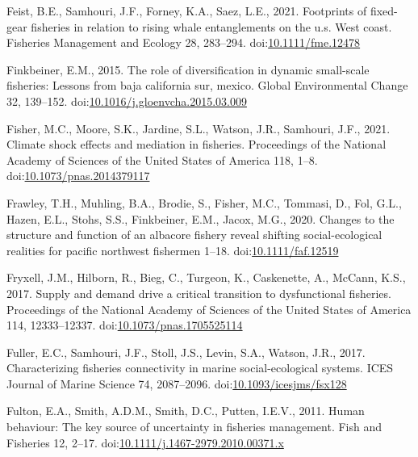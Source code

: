 \documentclass[]{elsarticle} %
\begin{document}
\leavevmode\hypertarget{ref-Feist2021}{}%
Feist, B.E., Samhouri, J.F., Forney, K.A., Saez, L.E., 2021. Footprints
of fixed-gear fisheries in relation to rising whale entanglements on the
u.s. West coast. Fisheries Management and Ecology 28, 283--294.
doi:\href{https://doi.org/10.1111/fme.12478}{10.1111/fme.12478}

\leavevmode\hypertarget{ref-Finkbeiner2015}{}%
Finkbeiner, E.M., 2015. The role of diversification in dynamic
small-scale fisheries: Lessons from baja california sur, mexico. Global
Environmental Change 32, 139--152.
doi:\href{https://doi.org/10.1016/j.gloenvcha.2015.03.009}{10.1016/j.gloenvcha.2015.03.009}

\leavevmode\hypertarget{ref-Fisher2021}{}%
Fisher, M.C., Moore, S.K., Jardine, S.L., Watson, J.R., Samhouri, J.F.,
2021. Climate shock effects and mediation in fisheries. Proceedings of
the National Academy of Sciences of the United States of America 118,
1--8.
doi:\href{https://doi.org/10.1073/pnas.2014379117}{10.1073/pnas.2014379117}

\leavevmode\hypertarget{ref-Frawley2020}{}%
Frawley, T.H., Muhling, B.A., Brodie, S., Fisher, M.C., Tommasi, D.,
Fol, G.L., Hazen, E.L., Stohs, S.S., Finkbeiner, E.M., Jacox, M.G.,
2020. Changes to the structure and function of an albacore fishery
reveal shifting social-ecological realities for pacific northwest
fishermen 1--18.
doi:\href{https://doi.org/10.1111/faf.12519}{10.1111/faf.12519}

\leavevmode\hypertarget{ref-Fryxell2017}{}%
Fryxell, J.M., Hilborn, R., Bieg, C., Turgeon, K., Caskenette, A.,
McCann, K.S., 2017. Supply and demand drive a critical transition to
dysfunctional fisheries. Proceedings of the National Academy of Sciences
of the United States of America 114, 12333--12337.
doi:\href{https://doi.org/10.1073/pnas.1705525114}{10.1073/pnas.1705525114}

\leavevmode\hypertarget{ref-Fuller2017}{}%
Fuller, E.C., Samhouri, J.F., Stoll, J.S., Levin, S.A., Watson, J.R.,
2017. Characterizing fisheries connectivity in marine social-ecological
systems. ICES Journal of Marine Science 74, 2087--2096.
doi:\href{https://doi.org/10.1093/icesjms/fsx128}{10.1093/icesjms/fsx128}

\leavevmode\hypertarget{ref-Fulton2011}{}%
Fulton, E.A., Smith, A.D.M., Smith, D.C., Putten, I.E.V., 2011. Human
behaviour: The key source of uncertainty in fisheries management. Fish
and Fisheries 12, 2--17.
doi:\href{https://doi.org/10.1111/j.1467-2979.2010.00371.x}{10.1111/j.1467-2979.2010.00371.x}
\end{document}
